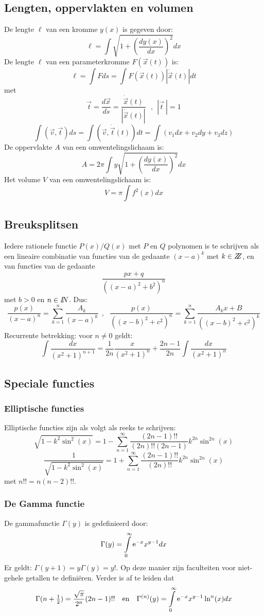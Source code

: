 \documentclass[twoside]{report}
\begin{document}
\subsection{Lengten, oppervlakten en volumen}
De lengte $\ell$ van een kromme $y(x)$ is gegeven door:
\[
\ell=\int\sqrt{1+\left(\frac{dy(x)}{dx}\right)^2}dx
\]
De lengte $\ell$ van een parameterkromme $F(\vec{x}(t))$ is:
\[
\ell=\int Fds=\int F(\vec{x}(t))|\dot{\vec{x}}(t)|dt
\]
met
\[
\vec{t}=\frac{d\vec{x}}{ds}=\frac{\dot{\vec{x}}(t)}{|\dot{\vec{x}}(t)|}~~~,~~|\vec{t}~|=1
\]
\[
\int(\vec{v},\vec{t})ds=\int(\vec{v},\dot{\vec{t}}(t))dt=\int(v_1dx+v_2dy+v_3dz)
\]
De oppervlakte $A$ van een omwentelingslichaam is:
\[
A=2\pi\int y\sqrt{1+\left(\frac{dy(x)}{dx}\right)^2}dx
\]
Het volume $V$ van een omwentelingslichaam is:
\[
V=\pi\int f^2(x)dx
\]

\subsection{Breuksplitsen}
\label{sec:breuksplits}
Iedere rationele functie $P(x)/Q(x)$ met $P$ en $Q$ polynomen is te schrijven
als een lineaire combinatie van functies van de gedaante $(x-a)^k$ met
$k\in Z\hspace{-1ex}Z$, en van functies van de gedaante
\[
\frac{px+q}{((x-a)^2+b^2)^n}
\]
met $b>0$ en $n\in I\hspace{-1mm}N$. Dus:
\[
\frac{p(x)}{(x-a)^n}=\sum_{k=1}^n\frac{A_k}{(x-a)^k}~~,~~~
\frac{p(x)}{((x-b)^2+c^2)^n}=\sum_{k=1}^n \frac{A_kx+B}{((x-b)^2+c^2)^k}
\]
Recurrente betrekking: voor $n\neq0$ geldt:
\[
\int\frac{dx}{(x^2+1)^{n+1}}=\frac{1}{2n}\frac{x}{(x^2+1)^n}+\frac{2n-1}{2n}\int\frac{dx}{(x^2+1)^n}
\]

\subsection{Speciale functies}
\subsubsection{Elliptische functies}
Elliptische functies zijn als volgt als reeks te schrijven:
\[
\sqrt{1-k^2\sin^2(x)}=1-\sum_{n=1}^\infty\frac{(2n-1)!!}{(2n)!!(2n-1)}k^{2n}\sin^{2n}(x)
\]
\[
\frac{1}{\sqrt{1-k^2\sin^2(x)}}=1+\sum_{n=1}^\infty\frac{(2n-1)!!}{(2n)!!}k^{2n}\sin^{2n}(x)
\]
met $n!!=n(n-2)!!$.

\subsubsection{De Gamma functie}
De gammafunctie $\Gamma(y)$ is gedefinieerd door:
\[
\Gamma(y)=\int\limits_0^\infty{\rm e}^{-x}x^{y-1}dx
\]
Er geldt: $\Gamma(y+1)=y\Gamma(y)=y!$. Op deze manier zijn faculteiten voor
niet-gehele getallen te defini\"eren. Verder is af te leiden dat
\[
\Gamma(n+\mbox{$\frac{1}{2}$})=\frac{\sqrt{\pi}}{2^n}(2n-1)!!~~\mbox{ en }~~
\Gamma^{(n)}(y)=\int\limits_0^\infty{\rm e}^{-x}x^{y-1}\ln^n(x)dx
\]
\end{document}
